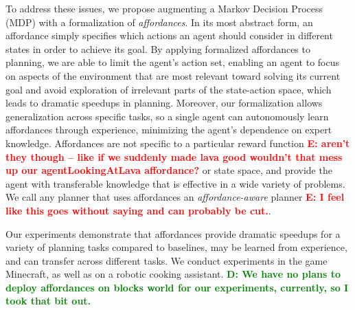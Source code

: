 \documentclass[conference]{IEEEtran}
\newcommand{\dnote}[1]{\textcolor{Green}{\textbf{D: #1}}}
\newcommand{\enote}[1]{\textcolor{Red}{\textbf{E: #1}}}
\begin{document}
To address these issues, we propose augmenting a Markov Decision
Process (MDP) with a formalization of {\em affordances}. In its most abstract form, an
affordance simply specifies which actions an agent should consider in
different states in order to achieve its goal\cite{gibson77}. By applying formalized affordances to planning, we are able to limit the agent's action set, enabling an agent to focus on aspects of the environment that
are most relevant toward solving its current goal and avoid
exploration of irrelevant parts of the state-action space, which leads
to dramatic speedups in planning. Moreover, our formalization allows generalization across
specific tasks, so a single agent can autonomously learn affordances
through experience, minimizing the agent's dependence on expert
knowledge. Affordances are not specific to a particular reward
function \enote{aren't they though -- like if we suddenly made lava good wouldn't that mess up our agentLookingAtLava affordance?} or state space, and provide the agent with transferable
knowledge that is effective in a wide variety of problems. We call any
planner that uses affordances an {\it affordance-aware} planner \enote{I feel like this goes without saying and can probably be cut.}.  

Our experiments demonstrate that affordances provide dramatic speedups for a variety
of planning tasks compared to baselines, may be learned from
experience, and can transfer across different tasks.  We conduct experiments
in the game Minecraft, as well as on a robotic cooking assistant. 
\dnote{We have no plans to deploy affordances on blocks world for our experiments, currently, so I took that bit out.}




\end{document}
